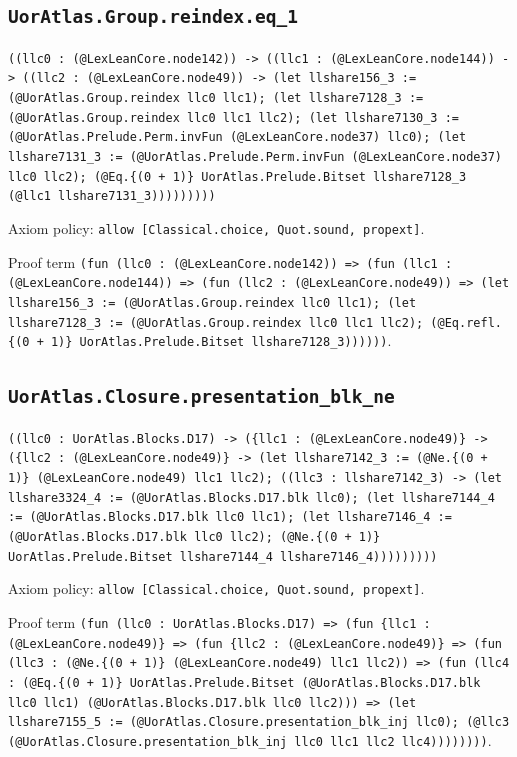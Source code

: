 \documentclass[11pt]{article}
\begin{document}
\subsection*{\texttt{UorAtlas.Group.reindex.eq\_1}}
\noindent\texttt{((llc0 : (@LexLeanCore.node142)) -> ((llc1 : (@LexLeanCore.node144)) -> ((llc2 : (@LexLeanCore.node49)) -> (let llshare156\_3 := (@UorAtlas.Group.reindex llc0 llc1); (let llshare7128\_3 := (@UorAtlas.Group.reindex llc0 llc1 llc2); (let llshare7130\_3 := (@UorAtlas.Prelude.Perm.invFun (@LexLeanCore.node37) llc0); (let llshare7131\_3 := (@UorAtlas.Prelude.Perm.invFun (@LexLeanCore.node37) llc0 llc2); (@Eq.\{(0 + 1)\} UorAtlas.Prelude.Bitset llshare7128\_3 (@llc1 llshare7131\_3)))))))))}\par
\noindent Axiom policy: \texttt{allow [Classical.choice, Quot.sound, propext]}.\par
\noindent Proof term \texttt{(fun (llc0 : (@LexLeanCore.node142)) => (fun (llc1 : (@LexLeanCore.node144)) => (fun (llc2 : (@LexLeanCore.node49)) => (let llshare156\_3 := (@UorAtlas.Group.reindex llc0 llc1); (let llshare7128\_3 := (@UorAtlas.Group.reindex llc0 llc1 llc2); (@Eq.refl.\{(0 + 1)\} UorAtlas.Prelude.Bitset llshare7128\_3))))))}.\par
\subsection*{\texttt{UorAtlas.Closure.presentation\_blk\_ne}}
\noindent\texttt{((llc0 : UorAtlas.Blocks.D17) -> (\{llc1 : (@LexLeanCore.node49)\} -> (\{llc2 : (@LexLeanCore.node49)\} -> (let llshare7142\_3 := (@Ne.\{(0 + 1)\} (@LexLeanCore.node49) llc1 llc2); ((llc3 : llshare7142\_3) -> (let llshare3324\_4 := (@UorAtlas.Blocks.D17.blk llc0); (let llshare7144\_4 := (@UorAtlas.Blocks.D17.blk llc0 llc1); (let llshare7146\_4 := (@UorAtlas.Blocks.D17.blk llc0 llc2); (@Ne.\{(0 + 1)\} UorAtlas.Prelude.Bitset llshare7144\_4 llshare7146\_4)))))))))}\par
\noindent Axiom policy: \texttt{allow [Classical.choice, Quot.sound, propext]}.\par
\noindent Proof term \texttt{(fun (llc0 : UorAtlas.Blocks.D17) => (fun \{llc1 : (@LexLeanCore.node49)\} => (fun \{llc2 : (@LexLeanCore.node49)\} => (fun (llc3 : (@Ne.\{(0 + 1)\} (@LexLeanCore.node49) llc1 llc2)) => (fun (llc4 : (@Eq.\{(0 + 1)\} UorAtlas.Prelude.Bitset (@UorAtlas.Blocks.D17.blk llc0 llc1) (@UorAtlas.Blocks.D17.blk llc0 llc2))) => (let llshare7155\_5 := (@UorAtlas.Closure.presentation\_blk\_inj llc0); (@llc3 (@UorAtlas.Closure.presentation\_blk\_inj llc0 llc1 llc2 llc4))))))))}.\par
\end{document}
